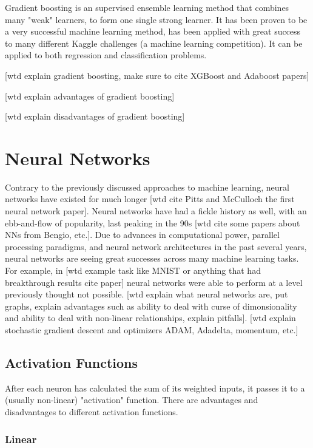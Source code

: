 Gradient boosting is an supervised ensemble learning method that combines many "weak" learners, to form one single strong learner.  It has been proven to be a very successful machine learning method, has been applied with great success to many different Kaggle challenges (a machine learning competition).  It can be applied to both regression and classification problems.

[wtd explain gradient boosting, make sure to cite XGBoost and Adaboost papers]

[wtd explain advantages of gradient boosting]

[wtd explain disadvantages of gradient boosting]

\section{Neural Networks}

Contrary to the previously discussed approaches to machine learning, neural networks have existed for much longer [wtd cite Pitts and McCulloch the first neural network paper].  Neural networks have had a fickle history as well, with an ebb-and-flow of popularity, last peaking in the 90s [wtd cite some papers about NNs from Bengio, etc.].  Due to advances in computational power, parallel processing paradigms, and neural network architectures in the past several years, neural networks are seeing great successes across many machine learning tasks.  For example, in [wtd example task like MNIST or anything that had breakthrough results cite paper] neural networks were able to perform at a level previously thought not possible.  [wtd explain what neural networks are, put graphs, explain advantages such as ability to deal with curse of dimonsionality and ability to deal with non-linear relationships, explain pitfalls]. [wtd explain stochastic gradient descent and optimizers ADAM, Adadelta, momentum, etc.]

\subsection{Activation Functions}

After each neuron has calculated the sum of its weighted inputs, it passes it to a (usually non-linear) "activation" function.  There are advantages and disadvantages to different activation functions.


\subsubsection{Linear}

